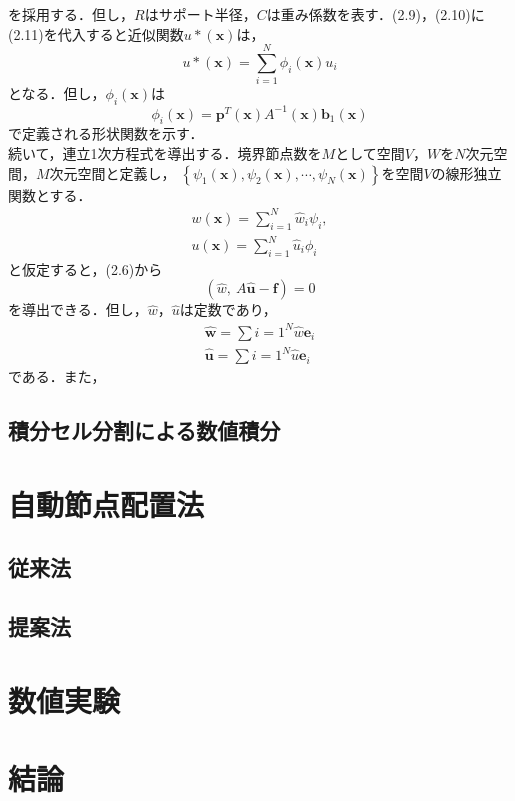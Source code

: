 \documentclass[twocolumn,head_space=15.0mm,foot_space=15.0mm,fleqn]{jlreq}
\numberwithin{equation}{section}
\begin{document}
を採用する．但し，$R$はサポート半径，$C$は重み係数を表す．(2.9)，(2.10)に(2.11)を代入すると近似関数$u* \left( \boldsymbol{x} \right)$は，
\begin{equation*}
	u* \left( \boldsymbol{x} \right) = \sum_{i=1}^N \phi_i \left( \boldsymbol{x} \right) u_i
\end{equation*}
となる．但し，$\phi_i \left( \boldsymbol{x} \right)$は
\begin{equation*}
	\phi_i \left( \boldsymbol{x} \right) = \boldsymbol{p}^T \left( \boldsymbol{x} \right) A^{-1} \left( \boldsymbol{x} \right) \boldsymbol{b}_1 \left( \boldsymbol{x} \right)
\end{equation*}
で定義される形状関数を示す． \\
続いて，連立1次方程式を導出する．境界節点数を$M$として空間$V$，$W$を$N$次元空間，$M$次元空間と定義し，
$\left\{ \psi_1 \left( \boldsymbol{x} \right), \psi_2 \left( \boldsymbol{x} \right), \cdots, \psi_N \left( \boldsymbol{x} \right) \right\}$を空間$V$の線形独立関数とする．
\begin{align}
	w \left( \boldsymbol{x} \right) = \sum_{i=1}^N \hat{w}_i \psi_i , \\
	u \left( \boldsymbol{x} \right) = \sum_{i=1}^N \hat{u}_i \phi_i
\end{align}
と仮定すると，(2.6)から
\begin{equation}
	\left( \hat{w}, \ A \hat{ \boldsymbol{u} } - \boldsymbol{f} \right) = 0
\end{equation}
を導出できる．但し，$\hat{w}$，$\hat{u}$は定数であり，
\begin{align*}
	\hat{ \boldsymbol{w} } = \sum{i=1}^N \hat{w} \boldsymbol{e}_i \\
	\hat{ \boldsymbol{u} } = \sum{i=1}^N \hat{u} \boldsymbol{e}_i
\end{align*}
である．また，

\subsection{積分セル分割による数値積分}

\section{自動節点配置法}

\subsection{従来法}
\subsection{提案法}

\section{数値実験}

\section{結論}
\end{document}
